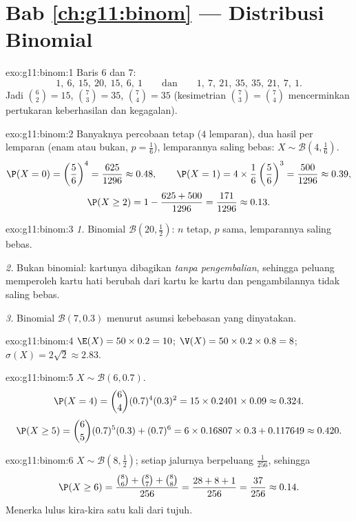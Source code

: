 \section*{Bab \ref{ch:g11:binom} --- Distribusi Binomial}

\begin{solution}{exo:g11:binom:1}
Baris $6$ dan $7$:
\[
1,\ 6,\ 15,\ 20,\ 15,\ 6,\ 1
\qquad\text{dan}\qquad
1,\ 7,\ 21,\ 35,\ 35,\ 21,\ 7,\ 1 .
\]
Jadi $\binom62 = 15$, $\binom73 = 35$, $\binom74 = 35$ (kesimetrian
$\binom73 = \binom74$ mencerminkan pertukaran keberhasilan dan kegagalan).
\end{solution}

\begin{solution}{exo:g11:binom:2}
Banyaknya percobaan tetap ($4$ lemparan), dua hasil per lemparan (enam atau
bukan, $p = \frac16$), lemparannya saling bebas: $X \sim \mathcal B(4, \frac16)$.
\[
\P(X=0) = \left(\frac56\right)^4 = \frac{625}{1296} \approx 0.48,
\qquad
\P(X=1) = 4 \times \frac16\left(\frac56\right)^3 = \frac{500}{1296}
\approx 0.39,
\]
\[
\P(X \geq 2) = 1 - \frac{625 + 500}{1296} = \frac{171}{1296}
\approx 0.13 .
\]
\end{solution}

\begin{solution}{exo:g11:binom:3}
\emph{1.} Binomial $\mathcal B(20, \frac12)$: $n$ tetap, $p$ sama,
lemparannya saling bebas.

\emph{2.} Bukan binomial: kartunya dibagikan \emph{tanpa pengembalian},
sehingga peluang memperoleh kartu hati berubah dari kartu ke kartu dan
pengambilannya tidak saling bebas.

\emph{3.} Binomial $\mathcal B(7, 0.3)$ menurut asumsi kebebasan yang
dinyatakan.
\end{solution}

\begin{solution}{exo:g11:binom:4}
$\E(X) = 50 \times 0.2 = 10$;
$\V(X) = 50 \times 0.2 \times 0.8 = 8$;
$\sigma(X) = 2\sqrt2 \approx 2.83$.
\end{solution}

\begin{solution}{exo:g11:binom:5}
$X \sim \mathcal B(6, 0.7)$.
\[
\P(X = 4) = \binom64 (0.7)^4 (0.3)^2 = 15 \times 0.2401 \times 0.09
\approx 0.324 .
\]
\[
\P(X \geq 5) = \binom65 (0.7)^5(0.3) + (0.7)^6
= 6 \times 0.16807 \times 0.3 + 0.117649 \approx 0.420 .
\]
\end{solution}

\begin{solution}{exo:g11:binom:6}
$X \sim \mathcal B\left(8, \frac12\right)$; setiap jalurnya berpeluang
$\frac{1}{256}$, sehingga
\[
\P(X \geq 6) = \frac{\binom86 + \binom87 + \binom88}{256}
= \frac{28 + 8 + 1}{256} = \frac{37}{256} \approx 0.14 .
\]
Menerka lulus kira-kira satu kali dari tujuh.
\end{solution}

